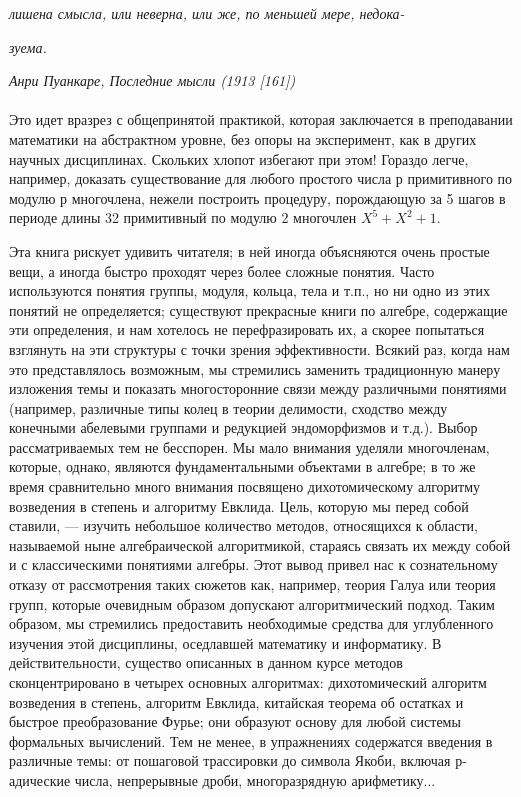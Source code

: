 \documentclass{mai_book}
\begin{document}
{{\hspace{0.6in} \small  \textit {лишена смысла, или неверна, или же, по меньшей мере, недока-}

\hspace{0.6in} \small  \textit {зуема.}


\hspace{1.8in} \small  \textit {Анри Пуанкаре, Последние мысли (1913 [161])}
\\\\

   Это идет вразрез с общепринятой практикой, которая заключается в преподавании математики на абстрактном уровне, без опоры на эксперимент, как в других научных дисциплинах. Скольких хлопот избегают при этом! Гораздо легче, например, доказать существование для любого простого числа р примитивного по модулю р многочлена, нежели построить процедуру, порождающую за 5 шагов в периоде длины 32 примитивный по модулю 2 многочлен $X^5 + X^2 + 1$.

   Эта книга рискует удивить читателя; в ней иногда объясняются очень простые вещи, а иногда быстро проходят через более сложные понятия. Часто используются понятия группы, модуля, кольца, тела и т.п., но ни одно из этих понятий не определяется; существуют прекрасные книги по алгебре, содержащие эти определения, и нам хотелось не перефразировать их, а скорее попытаться взглянуть на эти структуры с точки зрения эффективности. Всякий раз, когда нам это представлялось возможным, мы стремились заменить традиционную манеру изложения темы и показать многосторонние связи между различными понятиями (например, различные типы колец в теории делимости, сходство между конечными абелевыми группами и редукцией эндоморфизмов и т.д.). Выбор рассматриваемых тем не бесспорен. Мы мало внимания уделяли многочленам, которые, однако, являются фундаментальными объектами в алгебре; в то же время сравнительно много внимания посвящено дихотомическому алгоритму возведения в степень и алгоритму Евклида. Цель, которую мы перед собой ставили, — изучить небольшое количество методов, относящихся к области, называемой ныне алгебраической алгоритмикой, стараясь связать их между собой и с классическими понятиями алгебры. Этот вывод привел нас к сознательному отказу от рассмотрения таких сюжетов как, например,
\newpage
теория Галуа или теория групп, которые очевидным образом допускают алгоритмический подход. Таким образом, мы стремились предоставить необходимые средства для углубленного изучения этой дисциплины, оседлавшей математику и информатику. В действительности, существо описанных в данном курсе методов сконцентрировано в четырех основных алгоритмах: дихотомический алгоритм возведения в степень, алгоритм Евклида, китайская теорема об остатках и быстрое преобразование Фурье; они образуют основу для любой системы формальных вычислений. Тем не менее, в упражнениях содержатся введения в различные темы: от пошаговой трассировки до символа Якоби, включая р-адические числа, непрерывные дроби, многоразрядную арифметику...

}}
\end{document}

